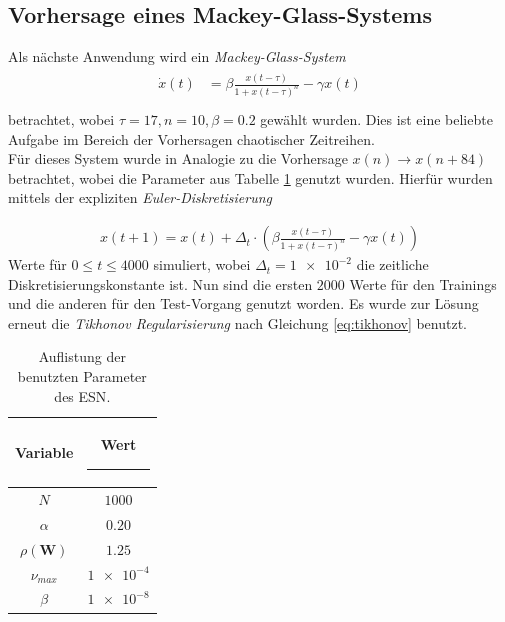 \clearpage

\subsection{Vorhersage eines Mackey-Glass-Systems}
Als nächste Anwendung wird ein \textit{Mackey-Glass-System}
\begin{align}
\label{eq:application_roessler_pde}
\begin{split}
\dot{x}(t) &= \beta \frac{x(t-\tau)}{1+x(t-\tau)^n}-\gamma x(t)\\
\end{split}
\end{align}
betrachtet, wobei $\tau = 17, n=10, \beta = 0.2$ gewählt wurden. Dies ist eine beliebte Aufgabe im Bereich der Vorhersagen chaotischer Zeitreihen.\\
Für dieses System wurde in Analogie zu  \citep{caraballo2014} die Vorhersage $x(n) \rightarrow x(n+84)$ betrachtet, wobei die Parameter aus Tabelle \ref{tab:application_mackeyglass} genutzt wurden. Hierfür wurden mittels der expliziten \textit{Euler-Diskretisierung} 

\begin{align}
x(t+1) = x(t) + \Delta_t \cdot \left(\beta \frac{x(t-\tau)}{1+x(t-\tau)^n}-\gamma x(t)  \right)
\end{align}
Werte für $0 \leq t \leq 4000$ simuliert, wobei $\Delta_t=\num{1e-2}$ die zeitliche Diskretisierungskonstante ist. Nun sind die ersten $2000$ Werte für den Trainings und die anderen für den Test-Vorgang genutzt worden. Es wurde zur Lösung erneut die \textit{Tikhonov Regularisierung} nach Gleichung \ref{eq:tikhonov} benutzt.

\begin{table}[H]
	\centering
		\begin{tabular}{|c|c|}
		\rule[-1ex]{0pt}{3.5ex} Variable & \hspace{4ex} Wert \rule[-1ex]{4ex}{0pt}\\ 
		\hline \hline 
		\rule[-1ex]{0pt}{3.5ex} $N$ & $1000$ \\ 
		\hline 
		\rule[-1ex]{0pt}{3.5ex} $\alpha$ & $0.20$ \\ 
		\hline 
		\rule[-1ex]{0pt}{3.5ex} $\rho(\mathbf{W})$ & $1.25$ \\ 
		\hline 
		\rule[-1ex]{0pt}{3.5ex} $\nu_{max}$ & $\num{1e-4}$ \\ 
		\hline 
		\rule[-1ex]{0pt}{3.5ex} $\beta$ & $\num{1e-8}$ \\ 
		\hline 
	\end{tabular} 
	\caption{Auflistung der benutzten Parameter des \textsc{ESN}.}
\label{tab:application_mackeyglass}
\end{table}

